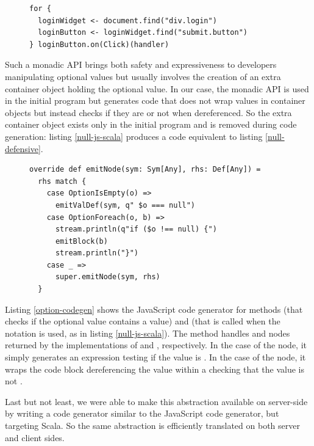 \documentclass[preprint]{sigplanconf}
\begin{document}
\begin{figure}
\begin{lstlisting}[label=null-js-scala,caption=Handling null references in js-scala]
for {
  loginWidget <- document.find("div.login")
  loginButton <- loginWidget.find("submit.button")
} loginButton.on(Click)(handler)
\end{lstlisting}
\end{figure}

Such a monadic API brings both safety and expressiveness to developers manipulating optional values
but usually involves the creation of an extra container object holding the optional value. In our
case, the monadic API is used in the initial program but generates code that does not wrap values in
container objects but instead checks if they are  or not when dereferenced. So the extra
container object exists only in the initial program and is removed during code generation: listing
\ref{null-js-scala} produces a code equivalent to listing
\ref{null-defensive}.

\begin{figure}
\begin{lstlisting}[caption=JavaScript code generator for null references handling
DSL,label=option-codegen,captionpos=b]
override def emitNode(sym: Sym[Any], rhs: Def[Any]) =
  rhs match {
    case OptionIsEmpty(o) =>
      emitValDef(sym, q" $o === null")
    case OptionForeach(o, b) =>
      stream.println(q"if ($o !== null) {")
      emitBlock(b)
      stream.println("}")
    case _ =>
      super.emitNode(sym, rhs)
  }
\end{lstlisting}
\end{figure}

Listing \ref{option-codegen} shows the JavaScript code generator for methods  (that
checks if the optional value contains a value) and  (that is called when the
 notation is used, as in listing \ref{null-js-scala}). The  method handles
 and  nodes returned by the implementations of
 and , respectively. In the case of the  node, it
simply generates an expression testing if the value is . In the case of the
 node, it wraps the code block dereferencing the value within a 
checking that the value is not .

Last but not least, we were able to make this abstraction available on server-side by writing a code
generator similar to the JavaScript code generator, but targeting Scala. So the same abstraction is
efficiently translated on both server and client sides.
\end{document}
